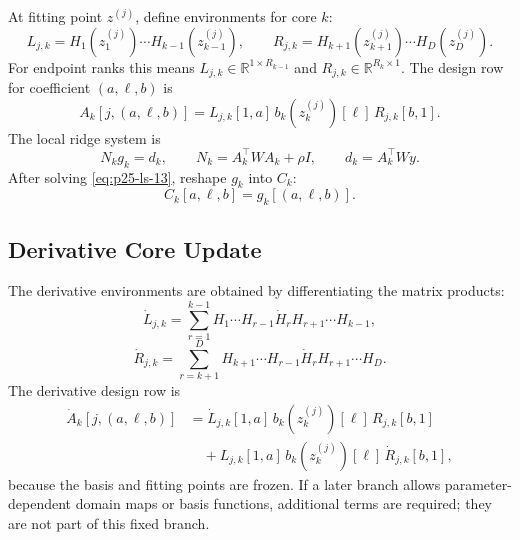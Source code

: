 \documentclass[11pt]{article}
\numberwithin{equation}{section}
\newcommand{\R}{\mathbb R}
\begin{document}
At fitting point \(z^{(j)}\), define environments for core \(k\):
\begin{equation}
    L_{j,k}
    =
    H_1(z_1^{(j)})\cdots H_{k-1}(z_{k-1}^{(j)}),
    \qquad
    R_{j,k}
    =
    H_{k+1}(z_{k+1}^{(j)})\cdots H_D(z_D^{(j)}).
    \label{eq:p25-ls-11}
\end{equation}
For endpoint ranks this means \(L_{j,k}\in\R^{1\times R_{k-1}}\) and
\(R_{j,k}\in\R^{R_k\times1}\).  The design row for coefficient
\((a,\ell,b)\) is
\begin{equation}
    A_k[j,(a,\ell,b)]
    =
    L_{j,k}[1,a]\,
    b_k(z_k^{(j)})[\ell]\,
    R_{j,k}[b,1].
    \label{eq:p25-ls-12}
\end{equation}
The local ridge system is
\begin{equation}
    N_k g_k=d_k,
    \qquad
    N_k=A_k^\top W A_k+\rho I,
    \qquad
    d_k=A_k^\top W y.
    \label{eq:p25-ls-13}
\end{equation}
After solving \eqref{eq:p25-ls-13}, reshape \(g_k\) into \(C_k\):
\begin{equation}
    C_k[a,\ell,b]=g_k[(a,\ell,b)].
    \label{eq:p25-ls-14}
\end{equation}

\subsection{Derivative Core Update}

The derivative environments are obtained by differentiating the matrix
products:
\begin{equation}
    \dot L_{j,k}
    =
    \sum_{r=1}^{k-1}
    H_1\cdots H_{r-1}\dot H_r H_{r+1}\cdots H_{k-1},
    \label{eq:p25-ls-15}
\end{equation}
\begin{equation}
    \dot R_{j,k}
    =
    \sum_{r=k+1}^{D}
    H_{k+1}\cdots H_{r-1}\dot H_r H_{r+1}\cdots H_D.
    \label{eq:p25-ls-16}
\end{equation}
The derivative design row is
\begin{equation}
\begin{aligned}
    \dot A_k[j,(a,\ell,b)]
    &=
    \dot L_{j,k}[1,a]\,b_k(z_k^{(j)})[\ell]\,R_{j,k}[b,1]\\
    &\quad+
    L_{j,k}[1,a]\,b_k(z_k^{(j)})[\ell]\,\dot R_{j,k}[b,1],
\end{aligned}
    \label{eq:p25-ls-17}
\end{equation}
because the basis and fitting points are frozen.  If a later branch allows
parameter-dependent domain maps or basis functions, additional terms are
required; they are not part of this fixed branch.
\end{document}
